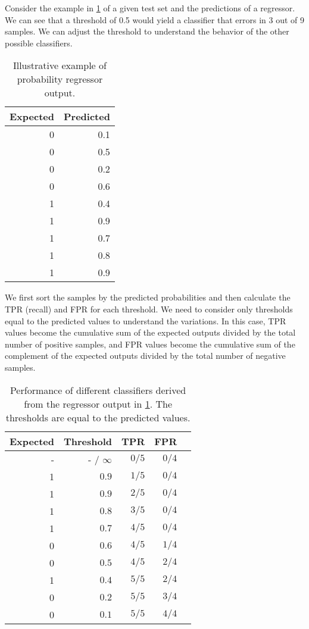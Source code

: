 Consider the example in \cref{tab:prob-reg-out} of a given test set and the predictions of
a regressor. We can see that a threshold of 0.5 would yield a classifier that errors
in 3 out of 9 samples.  We can adjust the threshold to understand the behavior of the
other possible classifiers.

\begin{table}\caption{Illustrative example of probability regressor output.}\label{tab:prob-reg-out}
  \centering
  \begin{tabular}{rr}
    \toprule
    \textbf{Expected} & \textbf{Predicted} \\
    \midrule
    0 & 0.1  \\
    0 & 0.5  \\
    0 & 0.2  \\
    0 & 0.6  \\
    1 & 0.4  \\
    1 & 0.9  \\
    1 & 0.7  \\
    1 & 0.8  \\
    1 & 0.9  \\
    \bottomrule
  \end{tabular}
\end{table}

We first sort the samples by the predicted probabilities and then calculate the TPR
(recall) and FPR for each threshold.  We need to consider only thresholds equal to the
predicted values to understand the variations.  In this case, TPR values become the
cumulative sum of the expected outputs divided by the total number of positive samples,
and FPR values become the cumulative sum of the complement of the expected outputs
divided by the total number of negative samples.

\begin{table}
  \centering
  \begin{tabular}{rrrrr}
    \toprule
    \textbf{Expected} & \textbf{Threshold} & \textbf{TPR} & \textbf{FPR}  \\
    \midrule
    - & - / $\infty$ & $0/5$ & $0/4$ \\
    1 & $0.9$        & $1/5$ & $0/4$ \\
    1 & $0.9$        & $2/5$ & $0/4$ \\
    1 & $0.8$        & $3/5$ & $0/4$ \\
    1 & $0.7$        & $4/5$ & $0/4$ \\
    0 & $0.6$        & $4/5$ & $1/4$ \\
    0 & $0.5$        & $4/5$ & $2/4$ \\
    1 & $0.4$        & $5/5$ & $2/4$ \\
    0 & $0.2$        & $5/5$ & $3/4$ \\
    0 & $0.1$        & $5/5$ & $4/4$ \\
    \bottomrule
  \end{tabular}
  \caption{
  Performance of different classifiers derived from the regressor output in
  \cref{tab:prob-reg-out}.  The thresholds are equal to the predicted values.
  }
  \label{tab:prob-reg-example}
\end{table}

